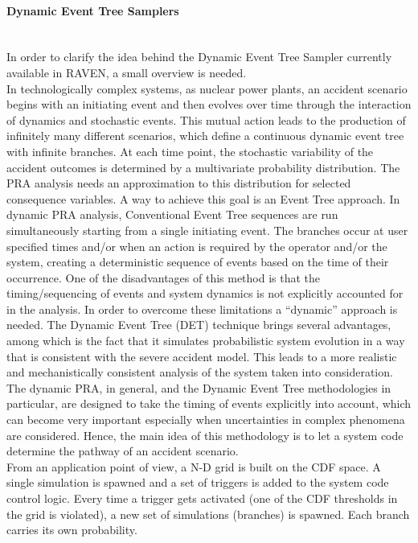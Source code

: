 \paragraph{Dynamic Event Tree Samplers}~\\
In order to clarify the idea behind the Dynamic Event Tree Sampler currently available in RAVEN, a small overview is 
needed.
\\In technologically complex systems, as nuclear power plants, an accident scenario begins with an initiating event and then 
evolves over time through the interaction of dynamics and stochastic events. This mutual action leads to the production of 
infinitely many different scenarios, which define a continuous dynamic event tree with infinite branches. At each time point, 
the stochastic variability of the accident outcomes is determined by a multivariate probability distribution. The PRA analysis 
needs an approximation to this distribution for selected consequence variables. A way to achieve this goal is an Event Tree 
approach. In dynamic PRA analysis, Conventional Event Tree sequences are run simultaneously starting from a single 
initiating event. The branches occur at user specified times and/or when an action is required by the operator and/or the 
system, creating a deterministic sequence of events based on the time of their occurrence. One of the disadvantages of 
this method is that the timing/sequencing of events and system dynamics is not explicitly accounted for in the analysis. In 
order to overcome these limitations a “dynamic” approach is needed. The Dynamic Event Tree (DET) technique brings 
several advantages, among which is the fact that it simulates probabilistic system evolution in a way that is consistent with 
the severe accident model. This leads to a more realistic and mechanistically consistent analysis of the system taken into 
consideration. The dynamic PRA, in general, and the Dynamic Event Tree methodologies in particular, are designed to 
take the timing of events explicitly into account, which can become very important especially when uncertainties in complex 
phenomena are considered. Hence, the main idea of this methodology is to let a system code determine the pathway of an 
accident scenario.
\\From an application point of view, a N-D grid is built on the CDF space. A single simulation is spawned and a set of 
triggers is added to the system code control logic. Every time a trigger gets activated (one of the CDF thresholds in the grid 
is violated), a new set of simulations (branches) is spawned. Each branch carries its own probability.
